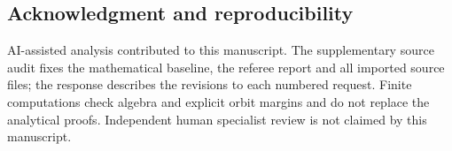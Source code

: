 \subsection*{Acknowledgment and reproducibility}
AI-assisted analysis contributed to this manuscript. The supplementary
source audit fixes the mathematical baseline, the referee report and
all imported source files; the response describes the revisions to each
numbered request. Finite computations check algebra and explicit orbit
margins and do not replace the analytical proofs. Independent human
specialist review is not claimed by this manuscript.
